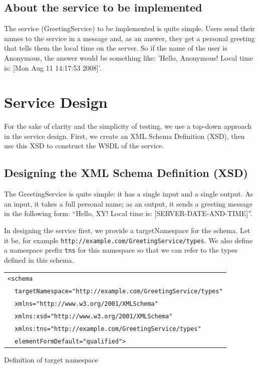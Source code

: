 \documentclass{article}
\begin{document}
\subsection{About the service to be implemented}

The service (GreetingService) to be implemented is quite
simple. Users send their names to the service in a message and,
as an answer, they get a
personal greeting that tells them the local time on the server. So
if the name of the user is Anonymous, the answer would be something
like: 'Hello, Anonymous! Local time is: [Mon Aug 11 14:17:53 2008]'.

\newpage

\section{Service Design}

For the sake of clarity and the simplicity of testing, we use a
top-down approach in the service design. First, we create an XML
Schema Definition (XSD), then use this XSD to construct the WSDL of
the service.

\subsection{Designing the XML Schema Definition (XSD)}

The GreetingService is quite simple: it has a single input and a single output.
As an input, it takes a full personal name; as an output, it sends a
greeting message in the following form: “Hello, XY! Local time is:
[SERVER-DATE-AND-TIME]”.

In designing the service first, we provide a targetNamespace for the schema. 
Let it be, for example \linebreak
\verb#http://example.com/GreetingService/types#. We also define a 
namespace prefix \verb#tns# for this namespace so that we can refer to 
the types defined in this schema.

\begin{illustration}
\begin{center}
\begin{tabular}{|l|}
\hline
\verb#<schema#\\
\verb#  targetNamespace="http://example.com/GreetingService/types"#\\
\verb#  xmlns="http://www.w3.org/2001/XMLSchema"#\\
\verb#  xmlns:xsd="http://www.w3.org/2001/XMLSchema"#\\
\verb#  xmlns:tns="http://example.com/GreetingService/types"#\\
\verb#  elementFormDefault="qualified">#\\
\hline
\end{tabular}
\end{center}
\caption{Definition of target namespace}
\end{illustration}
\end{document}
